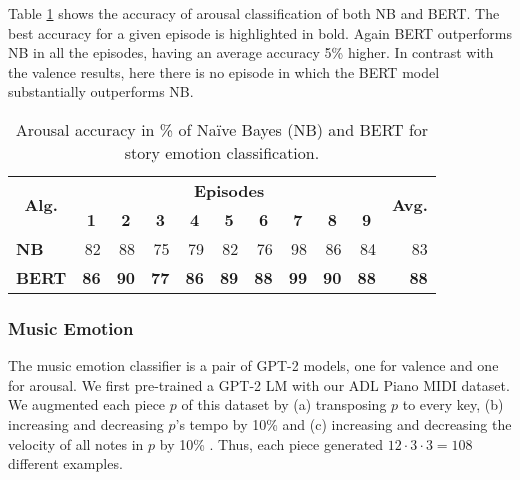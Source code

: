 Table \ref{tab:arousal} shows the accuracy of arousal classification
of both NB and BERT. The best accuracy for a given episode is highlighted in bold. Again BERT outperforms NB in all the episodes, having an average accuracy 5\% higher. In contrast with the valence results, here there is no episode in which the BERT model substantially outperforms NB.

\begin{table}[h]
\centering
\setlength{\tabcolsep}{4pt}
\begin{tabular}{crrrrrrrrrr}
\toprule
\multirow{2}{*}{\textbf{Alg.}} & \multicolumn{9}{c}{\textbf{Episodes}} & \multirow{2}{*}{\textbf{Avg.}} \\
\cmidrule{2-10}
& \multicolumn{1}{c}{\textbf{1}}   & \multicolumn{1}{c}{\textbf{2}}   & \multicolumn{1}{c}{\textbf{3}}  & \multicolumn{1}{c}{\textbf{4}} & \multicolumn{1}{c}{\textbf{5}}  & \multicolumn{1}{c}{\textbf{6}}  & \multicolumn{1}{c}{\textbf{7}} & \multicolumn{1}{c}{\textbf{8}}  & \multicolumn{1}{c}{\textbf{9}} &    \\
\midrule
\multicolumn{1}{l}{\textbf{NB}}   &   82 & 88  &  75 & 79   &  82 & 76  &  98 & 86   & 84    &   83 \\
\multicolumn{1}{l}{\textbf{BERT}}   &  \textbf{86}  & \textbf{90}  & \textbf{77}  &  \textbf{86} & \textbf{89}   & \textbf{88} & \textbf{99}   &  \textbf{90}   &  \textbf{88} &  \textbf{88}  \\
\bottomrule
\end{tabular}
\caption{Arousal accuracy in \% of Na\"ive Bayes (NB) and BERT for story emotion classification.}
\label{tab:arousal}
\end{table}

\subsubsection{Music Emotion}

The music emotion classifier is a pair of GPT-2 models, one for valence and one for arousal.
We first pre-trained a GPT-2 LM with our ADL Piano MIDI dataset. We augmented each piece $p$ of this dataset  by (a) transposing $p$ to every key, (b)
increasing and decreasing $p$'s tempo by 10\% and (c) increasing and decreasing
the velocity of all notes in $p$ by 10\% \cite{oore2017learning}. Thus, each
piece generated $12 \cdot 3 \cdot 3 = 108$ different examples.

